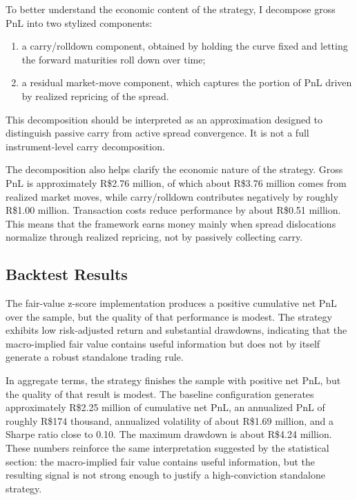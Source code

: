 \documentclass[11pt]{article}
\begin{document}
	To better understand the economic content of the strategy, I decompose gross PnL into two stylized components:
	\begin{enumerate}
		\item a carry/rolldown component, obtained by holding the curve fixed and letting the forward maturities roll down over time;
		\item a residual market-move component, which captures the portion of PnL driven by realized repricing of the spread.
	\end{enumerate}
	
	This decomposition should be interpreted as an approximation designed to distinguish passive carry from active spread convergence. It is not a full instrument-level carry decomposition.
	
	The decomposition also helps clarify the economic nature of the strategy. Gross PnL is approximately R\$2.76 million, of which about R\$3.76 million comes from realized market moves, while carry/rolldown contributes negatively by roughly R\$1.00 million. Transaction costs reduce performance by about R\$0.51 million. This means that the framework earns money mainly when spread dislocations normalize through realized repricing, not by passively collecting carry.
	
	\subsection{Backtest Results}
	\label{subsec:backtest_results}
	
	The fair-value z-score implementation produces a positive cumulative net PnL over the sample, but the quality of that performance is modest. The strategy exhibits low risk-adjusted return and substantial drawdowns, indicating that the macro-implied fair value contains useful information but does not by itself generate a robust standalone trading rule.
	
	In aggregate terms, the strategy finishes the sample with positive net PnL, but the quality of that result is modest. The baseline configuration generates approximately R\$2.25 million of cumulative net PnL, an annualized PnL of roughly R\$174 thousand, annualized volatility of about R\$1.69 million, and a Sharpe ratio close to 0.10. The maximum drawdown is about R\$4.24 million. These numbers reinforce the same interpretation suggested by the statistical section: the macro-implied fair value contains useful information, but the resulting signal is not strong enough to justify a high-conviction standalone strategy.
	
\end{document}
